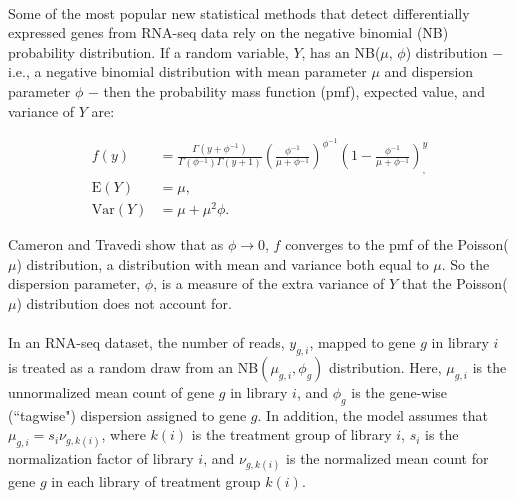 \documentclass[10pt]{article}
\providecommand{\nv}{{}^{-1}}
\providecommand{\rt}{\rightarrow}
\begin{document}
\paragraph{} \indent Some of the most popular new statistical methods that detect differentially expressed %
genes from RNA-seq data rely on the negative binomial (NB) probability distribution. If a random variable, $Y$, has an NB($\mu$, $\phi$) distribution $-$ i.e., a negative binomial distribution with mean parameter $\mu$ and dispersion parameter $\phi$ $-$ then the probability mass function (pmf), expected value, and variance of $Y$ are:

\begin{align*}
f(y) &= \frac{\Gamma(y+ \phi \nv)}{\Gamma(\phi \nv) \Gamma(y + 1)} \left ( \frac{\phi \nv}{\mu + \phi \nv} \right ) ^{\phi \nv} \left ( 1 - \frac{\phi \nv}{\mu + \phi \nv} \right )^ {y}_, \\
\text{E}(Y) &= \mu, \\
\text{Var}(Y) &= \mu + \mu^2 \phi.
\end{align*}

Cameron and Travedi \cite{travedi} show that as $\phi \rt 0$, $f$ converges to the pmf of the Poisson($\mu$) distribution, a distribution with mean and variance both equal to $\mu$. So the dispersion parameter, $\phi$, is a measure of the extra variance of $Y$ that the Poisson($\mu$) distribution does not account for.

\paragraph{} \indent In an RNA-seq dataset, the number of reads, $y_{g, i}$, mapped to gene $g$ in library $i$ is treated as a random draw from an NB$(\mu_{g, i}, \phi_g)$ distribution. Here, $\mu_{g, i}$ is the unnormalized mean count of gene $g$ in library $i$, and $\phi_g$ is the gene-wise (``tagwise") dispersion assigned to gene $g$. In addition, the model assumes that $\mu_{g, i} = s_i \nu_{g, k(i)}$, where $k(i)$ is the treatment group of library $i$, $s_i$ is the normalization factor of library $i$, and $\nu_{g, k(i)}$ is the normalized mean count for gene $g$ in each library of treatment group $k(i)$.
\end{document}
